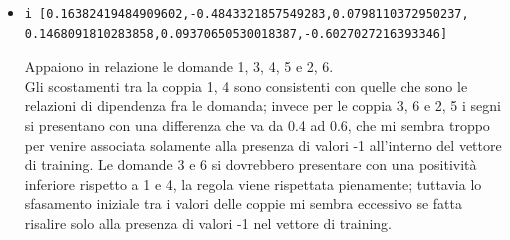 \begin{itemize}
\item \begin{verbatim}i [0.16382419484909602,-0.4843321857549283,0.0798110372950237,
0.1468091810283858,0.09370650530018387,-0.6027027216393346]
\end{verbatim}
Appaiono in relazione le domande 1, 3, 4, 5 e 2, 6.\\
Gli scostamenti tra la coppia 1, 4 sono consistenti con quelle che sono le relazioni di dipendenza fra le domanda; invece per le coppia 3, 6 e 2, 5 i segni si presentano con una differenza che va da 0.4 ad 0.6, che mi sembra troppo per venire associata solamente alla presenza di valori -1 all'interno del vettore di training.
Le domande 3 e 6 si dovrebbero presentare con una positivit\`a inferiore rispetto a 1 e 4, la regola viene rispettata pienamente; tuttavia lo sfasamento iniziale tra i valori delle coppie mi sembra eccessivo se fatta risalire solo alla presenza di valori -1 nel vettore di training.
\end{itemize}

